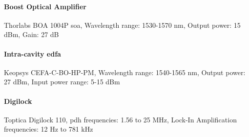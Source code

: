 \paragraph{Boost Optical Amplifier} Thorlabs BOA 1004P \gls{soa}, Wavelength range: 1530-1570 nm, Output power: 15 dBm, Gain: 27 dB \cite{boa}

\paragraph{Intra-cavity \acrlong{edfa}} Keopsys CEFA-C-BO-HP-PM, Wavelength range: 1540-1565 nm, Output power: 27 dBm, Input power range: 5-15 dBm \cite{edfa}

\paragraph{Digilock} Toptica Digilock 110, \gls{pdh} frequencies: 1.56 to 25 MHz, Lock-In Amplification frequencies: 12 Hz to 781 kHz \cite{digilock}


